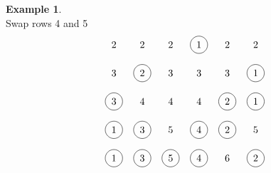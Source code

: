 \documentclass[submission]{FPSAC2018}
\newcommand{\0}{\phantom{c}}
\theoremstyle{plain}
\theoremstyle{definition}
\newtheorem{example}[thm]{Example}
\numberwithin{equation}{section}
\begin{document}
\begin{example}
\[\]
Swap rows 4 and 5
\[
\begin{tikzpicture}\node at (0, 5){2};\node at (1, 5){2};\node at (2, 5){2};\node[circle, draw=black] at (3, 5){1};\node at (4, 5){2};\node at (5, 5){2};\node at (0, 4){3};\node[circle, draw=black] at (1, 4){2};\node at (2, 4){3};\node at (3, 4){3};\node at (4, 4){3};\node[circle, draw=black] at (5, 4){1};\node[circle, draw=black] at (0, 3){3};\node at (1, 3){4};\node at (2, 3){4};\node at (3, 3){4};\node[circle, draw=black] at (4, 3){2};\node[circle, draw=black] at (5, 3){1};\node[circle, draw=black] at (0, 2){1};\node[circle, draw=black] at (1, 2){3};\node at (2, 2){5};\node[circle, draw=black] at (3, 2){4};\node[circle, draw=black] at (4, 2){2};\node at (5, 2){5};\node[circle, draw=black] at (0, 1){1};\node[circle, draw=black] at (1, 1){3};\node[circle, draw=black] at (2, 1){5};\node[circle, draw=black] at (3, 1){4};\node at (4, 1){6};\node[circle, draw=black] at (5, 1){2};\end{tikzpicture}
\]
\end{example}

\printbibliography

%
\end{document}
